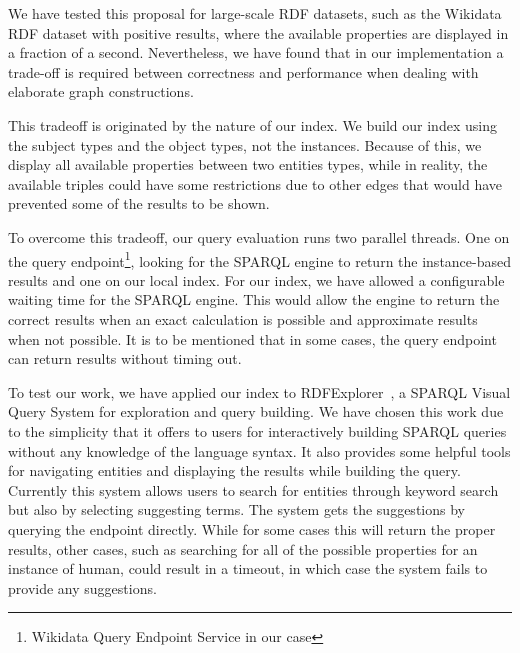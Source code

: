 We have tested this proposal for large-scale RDF datasets, such as the Wikidata RDF dataset with positive results, where the available properties are displayed in a fraction of a second. 
Nevertheless, we have found that in our implementation a trade-off is required between correctness and performance when dealing with elaborate graph constructions.

This tradeoff is originated by the nature of our index. 
We build our index using the subject types and the object types, not the instances. 
Because of this, we display all available properties between two entities types, while in reality, the available triples could have some restrictions due to other edges that would have prevented some of the results to be shown.

To overcome this tradeoff, our query evaluation runs two parallel threads. 
One on the query endpoint\footnote{Wikidata Query Endpoint Service in our case}, looking for the SPARQL engine to return the instance-based results and one on our local index. 
For our index, we have allowed a configurable waiting time for the SPARQL engine. 
This would allow the engine to return the correct results when an exact calculation is possible and approximate results when not possible. 
It is to be mentioned that in some cases, the query endpoint can return results without timing out.

To test our work, we have applied our index to RDFExplorer~\cite{Vargas2019}, a SPARQL Visual Query System for exploration and query building. 
We have chosen this work due to the simplicity that it offers to users for interactively building SPARQL queries without any knowledge of the language syntax. 
It also provides some helpful tools for navigating entities and displaying the results while building the query. 
Currently this system allows users to search for entities through keyword search but also by selecting suggesting terms. 
The system gets the suggestions by querying the endpoint directly. 
While for some cases this will return the proper results, other cases, such as searching for all of the possible properties for an instance of human, could result in a timeout, in which case the system fails to provide any suggestions.

